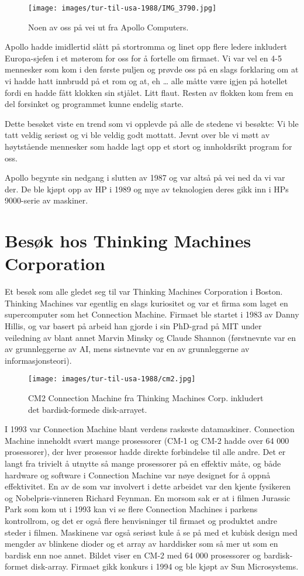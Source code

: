 \begin{figure}
	\texttt{[image: images/tur-til-usa-1988/IMG\_3790.jpg]}
	\caption{Noen av oss på vei ut fra Apollo Computers.}
\end{figure}

Apollo hadde imidlertid slått på stortromma og linet opp flere ledere inkludert Europa-sjefen i et møterom for oss for å fortelle om firmaet. Vi var vel en 4-5 mennesker som kom i den første puljen og prøvde oss på en slags forklaring om at vi hadde hatt innbrudd på et rom og at, eh … alle måtte være igjen på hotellet fordi en hadde fått klokken sin stjålet. Litt flaut. Resten av flokken kom frem en del forsinket og programmet kunne endelig starte.

Dette besøket viste en trend som vi opplevde på alle de stedene vi besøkte: Vi ble tatt veldig seriøst og vi ble veldig godt mottatt. Jevnt over ble vi møtt av høytstående mennesker som hadde lagt opp et stort og innholdsrikt program for oss.

Apollo begynte sin nedgang i slutten av 1987 og var altså på vei ned da vi var der. De ble kjøpt opp av HP i 1989 og mye av teknologien deres gikk inn i HPs 9000-serie av maskiner.

\section{Besøk hos Thinking Machines Corporation}

Et besøk som alle gledet seg til var Thinking Machines Corporation i Boston. Thinking Machines var egentlig en slags kuriositet og var et firma som laget en supercomputer som het Connection Machine. Firmaet ble startet i 1983 av Danny Hillis, og var basert på arbeid han gjorde i sin PhD-grad på MIT under veiledning av blant annet Marvin Minsky og Claude Shannon (førstnevnte var en av grunnleggerne av AI, mens sistnevnte var en av grunnleggerne av informasjonsteori).

\begin{figure}
	\texttt{[image: images/tur-til-usa-1988/cm2.jpg]}
	\caption{CM2 Connection Machine fra Thinking Machines Corp. inkludert det bardisk-formede disk-arrayet.}
\end{figure}

I 1993 var Connection Machine blant verdens raskeste datamaskiner. Connection Machine inneholdt svært mange prosessorer (CM-1 og CM-2 hadde over 64 000 prosessorer), der hver prosessor hadde direkte forbindelse til alle andre. Det er langt fra trivielt å utnytte så mange prosessorer på en effektiv måte, og både hardware og software i Connection Machine var nøye designet for å oppnå effektivitet. En av de som var involvert i dette arbeidet var den kjente fysikeren og Nobelpris-vinneren Richard Feynman. En morsom sak er at i filmen Jurassic Park som kom ut i 1993 kan vi se flere Connection Machines i parkens kontrollrom, og det er også flere henvisninger til firmaet og produktet andre steder i filmen. Maskinene var også seriøst kule å se på med et kubisk design med mengder av blinkene dioder og et array av harddisker som så mer ut som en bardisk enn noe annet. Bildet viser en CM-2 med 64 000 prosessorer og bardisk-formet disk-array. Firmaet gikk konkurs i 1994 og ble kjøpt av Sun Microsystems.

